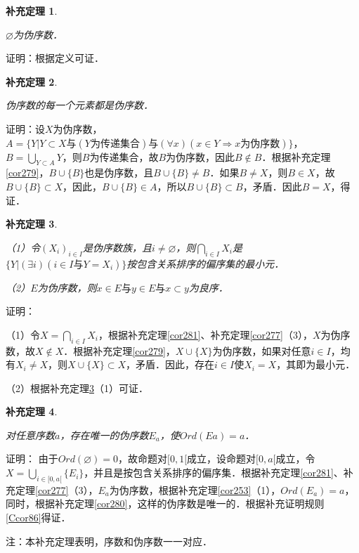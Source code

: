 \documentclass[12pt, a4paper, oneside]{book}
\newtheorem{cor}{补充定理}
\begin{document}
			\begin{cor}\label{cor282}
				\hfill\par
				$\varnothing$为伪序数．
			\end{cor}
			证明：根据定义可证．
			
			\begin{cor}\label{cor283}
				\hfill\par
				伪序数的每一个元素都是伪序数．
			\end{cor}
			证明：设$X$为伪序数，$A=\{Y|Y\subset X\text{与}(Y\text{为传递集合})\text{与}(\forall x)(x\in Y\Rightarrow x\text{为伪序数})\}$，$B=\bigcup\limits_{Y\subset A}Y$，则$B$为传递集合，故$B$为伪序数，因此$B\notin B$．根据补充定理\ref{cor279}，$B\cup\{B\}$也是伪序数，且$B\cup\{B\}\neq B$．如果$B\neq X$，则$B\in X$，故$B\cup\{B\}\subset X$，因此，$B\cup\{B\}\in A$，所以$B\cup\{B\}\subset B$，矛盾．因此$B=X$，得证．
			
			\begin{cor}\label{cor284}
				\hfill\par
				（1）令$(X_i)_{i\in I}$是伪序数族，且$i\neq \varnothing$，则$\bigcap\limits_{i\in I}X_i$是$\{Y|(\exists i)(i\in I\text{与}Y=X_i)\}$按包含关系排序的偏序集的最小元．
				\par
				（2）$E$为伪序数，则$x\in E\text{与}y\in E\text{与}x\subset y$为良序．
			\end{cor}
			证明：
			\par
			（1）令$X=\bigcap\limits_{i\in I}X_i$，根据补充定理\ref{cor281}、补充定理\ref{cor277}（3），$X$为伪序数，故$X\notin X$．根据补充定理\ref{cor279}，$X\cup\{X\}$为伪序数，如果对任意$i\in I$，均有$X_i\neq X$，则$X\cup\{X\}\subset X$，矛盾．因此，存在$i\in I$使$X_i=X$，其即为最小元．
			\par
			（2）根据补充定理\ref{cor284}（1）可证．
			
			\begin{cor}\label{cor285}
				\hfill\par
				对任意序数$a$，存在唯一的伪序数$E_a$，使$Ord(Ea)=a$．
			\end{cor}
			证明：
			由于$Ord(\varnothing)=0$，故命题对$[0, 1[$成立，设命题对$[0, a[$成立，令$X=\bigcup\limits_{i\in [0, a[}\{E_i\}$，并且是按包含关系排序的偏序集．根据补充定理\ref{cor281}、补充定理\ref{cor277}（3），$E_a$为伪序数，根据补充定理\ref{cor253}（1），$Ord(E_a)=a$，同时，根据补充定理\ref{cor280}，这样的伪序数是唯一的．根据补充证明规则\ref{Ccor86}得证．
			\par
			注：本补充定理表明，序数和伪序数一一对应．
			
\end{document}
